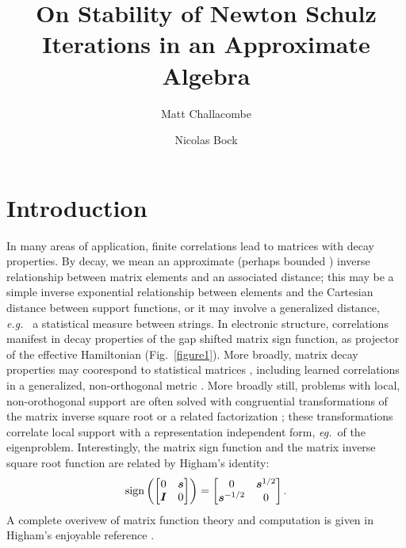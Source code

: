 \documentclass[letterpaper,twocolumn,amsmath,amsfont,amssymb,english,aps,jcp,preprintnumbers,groupaddress,nofootinbib,tightenlines]{revtex4}
\newcommand{\mat}[1]{\boldsymbol{#1}}
\begin{document}
\title{On Stability of Newton Schulz Iterations in an Approximate Algebra}

\author{Matt Challacombe}

\author{Nicolas Bock}


\maketitle
\section{Introduction}

In many areas of application, finite correlations lead to matrices with decay properties.  By decay, we mean an approximate 
(perhaps bounded \cite{}) inverse relationship between matrix elements and an associated distance;  this may be a simple inverse 
exponential relationship between elements and the Cartesian distance between support functions, or it may 
involve a generalized distance, {\em e.g.}~ a statistical measure between strings.  
In electronic structure,  correlations manifest in decay properties of the gap shifted matrix 
sign function, as projector of the effective Hamiltonian (Fig.~\ref{figure1}).  
More broadly, matrix decay properties may coorespond to statistical matrices 
\cite{penrose1974,voit00,Anselin2003,Hardin2013,Krishtal2014}, including learned correlations in a 
generalized, non-orthogonal metric \cite{}. More broadly still, problems with local, non-orothogonal support 
are often solved with congruential transformations of the matrix inverse square root \cite{Lowdin56,naidu11} or a related factorization \cite{Krishtal2014};
these transformations correlate local support with a representation independent form, {\em eg.}~of the eigenproblem. 
Interestingly, the matrix sign function and the matrix inverse square root function are related by Higham's identity:
\begin{equation}
\rm{sign} \left( \begin{bmatrix} 0 & \mat{s}      \\ \mat{I}       & 0\end{bmatrix} \right)  =
                 \begin{bmatrix} 0 & \mat{s}^{1/2} \\ \mat{s}^{-1/2} & 0\end{bmatrix}  .
\end{equation}
A complete overivew of matrix function theory and computation is given in Higham's enjoyable reference \cite{Higham08}. 
\end{document}
